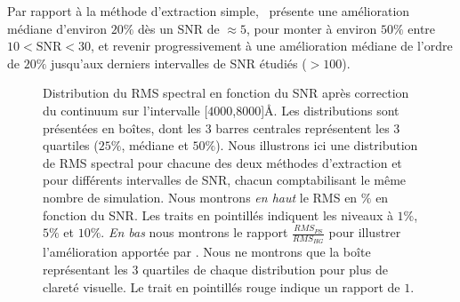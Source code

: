 \documentclass[../main/main.tex]{subfiles}
\begin{document}
Par rapport à la méthode d'extraction simple, \hypergal\ présente une
amélioration médiane d'environ $20\%$ dès un SNR de $\approx5$, pour monter à
environ $50\%$ entre $10<\text{SNR}<30$, et revenir progressivement à une amélioration
médiane de l'ordre de $20\%$ jusqu'aux derniers intervalles de SNR
étudiés ($>100$).

\begin{figure}[ht]
  \centering
  \caption[Distribution du RMS spectral en fonction du SNR après
  correction du continuum.]{Distribution du RMS spectral en fonction du SNR après
    correction du continuum sur l'intervalle [$4000$,$8000$]\AA. Les
    distributions sont présentées en boîtes, dont les 3 barres
    centrales représentent les 3 quartiles ($25\%$, médiane et $50\%$). Nous illustrons ici une
    distribution de RMS spectral pour chacune des deux méthodes
    d'extraction et pour différents intervalles de SNR, chacun comptabilisant le
    même nombre de simulation. Nous montrons \emph{en haut} le RMS en $\%$
    en fonction du SNR. Les traits en pointillés indiquent les niveaux à
    $1\%$, $5\%$ et $10\%$. \emph{En bas} nous montrons le rapport
    $\frac{RMS_{PS}}{RMS_{HG}}$ pour illustrer l'amélioration apportée par
    \hypergal. Nous ne montrons que la boîte représentant les 3 quartiles de
    chaque distribution pour plus de clareté visuelle. Le trait en
    pointillés rouge indique un rapport de $1$.}
  \label{fig:simu_rms_snr_continuum_divided}
\end{figure}
\end{document}
